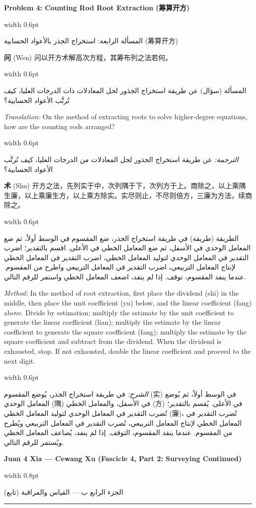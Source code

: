 \documentclass[11pt,a4paper]{article}
\newlength{\cnwidth}
\newlength{\arwidth}
\newcommand{\paralleltext}[2]{%
  \par\medskip\noindent
  \begin{minipage}[t]{\cnwidth}%
    \small #1%
  \end{minipage}%
  \hfill\textcolor{colrule}{\vrule width 0.6pt}\hfill
  \begin{minipage}[t]{\arwidth}%
    \small\arabicfont\beginR #2\endR%
  \end{minipage}%
  \par\medskip
}
\newcommand{\parallelsection}[2]{%
  \par\bigskip\noindent
  \begin{minipage}[t]{\cnwidth}%
    \Large\bfseries\color{sectioncolor} #1%
  \end{minipage}%
  \hfill\textcolor{colrule}{\vrule width 0.8pt}\hfill
  \begin{minipage}[t]{\arwidth}%
    \Large\arabicfontbf\color{sectioncolor}\beginR #2\endR%
  \end{minipage}%
  \par\medskip\noindent\textcolor{colrule}{\rule{\textwidth}{0.6pt}}\par\medskip
}
\newcommand{\parallelsubsection}[2]{%
  \par\medskip\noindent
  \begin{minipage}[t]{\cnwidth}%
    \large\bfseries\color{sectioncolor} #1%
  \end{minipage}%
  \hfill\textcolor{colrule}{\vrule width 0.6pt}\hfill
  \begin{minipage}[t]{\arwidth}%
    \large\arabicfontbf\color{sectioncolor}\beginR #2\endR%
  \end{minipage}%
  \par\smallskip
}
\newcommand{\cnlabel}[1]{\textbf{\color{notecolor}#1}}
\newcommand{\arlabel}[1]{\arabicfontbf\color{notecolor}\beginR #1\endR}
\begin{document}
\parallelsubsection{Problem 4: Counting Rod Root Extraction (筹算开方)}{المسألة الرابعة: استخراج الجذر بالأعواد الحسابية (筹算开方)}

\paralleltext{%
\cnlabel{问} (Wen) 问以开方术解高次方程，其筹布列之法若何。
}{%
\arlabel{المسألة} (سؤال) عن طريقة استخراج الجذور لحل المعادلات ذات الدرجات العليا، كيف تُرتَّب الأعواد الحسابية؟
}

\paralleltext{%
\textit{Translation:} On the method of extracting roots to solve higher-degree equations, how are the counting rods arranged?
}{%
\textit{الترجمة:} عن طريقة استخراج الجذور لحل المعادلات من الدرجات العليا، كيف تُرتَّب الأعواد الحسابية؟
}

\paralleltext{%
\cnlabel{术} (Shu) 开方之法，先列实于中，次列隅于下，次列方于上。商除之，以上乘隅生廉，以上乘廉生方，以上乘方除实。实尽则止，不尽则倍方，三廉为方法，续商除之。
}{%
\arlabel{الطريقة} (طريقة) في طريقة استخراج الجذر، ضع المقسوم في الوسط أولاً، ثم ضع المعامل الوحدي في الأسفل، ثم ضع المعامل الخطي في الأعلى. اقسم بالتقدير؛ اضرب التقدير في المعامل الوحدي لتوليد المعامل الخطي، اضرب التقدير في المعامل الخطي لإنتاج المعامل التربيعي، اضرب التقدير في المعامل التربيعي واطرح من المقسوم. عندما ينفد المقسوم، توقف. إذا لم ينفد، اضعف المعامل الخطي واستمر للرقم التالي.
}

\paralleltext{%
\textit{Method:} In the method of root extraction, first place the dividend (shi) in the middle, then place the unit coefficient (yu) below, and the linear coefficient (fang) above. Divide by estimation; multiply the estimate by the unit coefficient to generate the linear coefficient (lian); multiply the estimate by the linear coefficient to generate the square coefficient (fang); multiply the estimate by the square coefficient and subtract from the dividend. When the dividend is exhausted, stop. If not exhausted, double the linear coefficient and proceed to the next digit.
}{%
\textit{الشرح:} في طريقة استخراج الجذر، يُوضع المقسوم (实) في الوسط أولاً، ثم يُوضع المعامل الوحدي (隅) في الأسفل، والمعامل الخطي (方) في الأعلى. يُقسم بالتقدير؛ تُضرب التقدير في المعامل الوحدي لتوليد المعامل الخطي (廉)، تُضرب التقدير في المعامل الخطي لإنتاج المعامل التربيعي، تُضرب التقدير في المعامل التربيعي ويُطرح من المقسوم. عندما ينفد المقسوم، التوقف. إذا لم ينفد، يُضاعف المعامل الخطي ويُستمر للرقم التالي.
}

\newpage

\parallelsection{Juan 4 Xia — Cewang Xu (Fascicle 4, Part 2: Surveying Continued)}{الجزء الرابع ب — القياس والمراقبة (تابع)}
\end{document}
